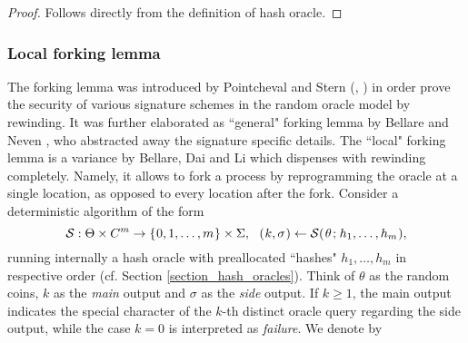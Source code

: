 \documentclass[psamsfonts, reqno]{amsart}
\theoremstyle{definition}
\theoremstyle{remark}
\numberwithin{equation}{section}
\begin{document}
\begin{proof}
Follows directly from the definition of hash oracle.
\end{proof}

\subsubsection{Local forking lemma}\label{section_local_forking_lemma}

The forking lemma was introduced by
Pointcheval and Stern
(\cite{paper_pointcheval_stern_1}, \cite{paper_pointcheval_stern_2})
in order prove the security of various signature schemes
in the random oracle model
by rewinding.
It was further elaborated as
``general" forking lemma
by Bellare and Neven
\cite{paper_bellare_musig}, who
abstracted away the signature specific details.
The ``local" forking lemma is a variance by
Bellare, Dai and Li \cite{paper_bellare_local_forking}
which dispenses with rewinding completely.
Namely, it allows to fork a process
by reprogramming the oracle at a single location,
as opposed to every location after the fork.
Consider a deterministic algorithm of the form
\vspace{5pt}
\begin{equation}\label{local_forking_s_form}
\mathcal{S}: \Theta \times C^m \rightarrow
\{\hspace{0.5pt}0, 1, \dots, m\hspace{0.5pt}\} \times \Sigma,
\ \ (
	\hspace{0.5pt}
	k,
	\sigma
	\hspace{0.5pt}
)
\leftarrow
\mathcal{S}(
	\hspace{1pt}
	\theta
	\hspace{1pt}
	;
	\hspace{1pt}
	h_1,
	\dots,
	h_m
	\hspace{0.5pt}
),
\vspace{5pt}
\end{equation}
running internally a hash oracle
with preallocated ``hashes" $h_1, \dots, h_m$
in respective order (cf. Section \ref{section_hash_oracles}).
Think of $\theta$ as the random coins,
$k$ as the \textit{main} output and
$\sigma$ as the \textit{side} output.
If $k \ge 1$, the main output indicates
the special character of the $k$-th distinct
oracle query regarding the side output,
while the case $k = 0$ is interpreted
as \textit{failure}. We denote by
\vspace{6pt}
\end{document}
